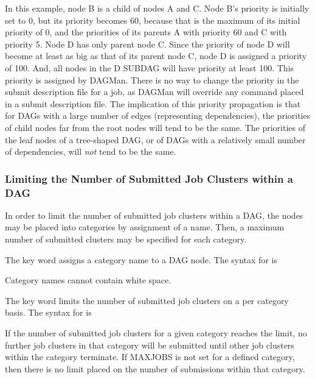 In this example, node B is a child of nodes A and C. 
Node B's priority is initially set to 0,
but its priority becomes 60,
because that is the maximum of its initial priority of 0,
and the priorities of its parents
A with priority 60 and C with priority 5.
Node D has only parent node C.
Since the priority of node D will become at least as big as that of 
its parent node C,
node D is assigned a priority of 100.
And, all nodes in the D SUBDAG will have priority at least 100.
This priority is assigned by DAGMan.
There is no way to change the priority in the submit description file for a job,
as DAGMan will override any  command placed
in a submit description file.
The implication of this priority propagation is
that for DAGs with a large number of edges (representing dependencies), 
the priorities of child nodes far from the root nodes 
will tend to be the same.
The priorities of the leaf nodes of a tree-shaped DAG,
or of DAGs with a relatively small number of dependencies,
will \emph{not} tend to be the same.

\subsubsection{\label{sec:DAG-node-category}Limiting the Number of Submitted Job Clusters within a DAG}


In order to limit the number of submitted job clusters within a DAG,
the nodes may be placed into categories by assignment of a name.
Then, a maximum number of submitted clusters may be specified
for each category.

The  key word assigns a category name to a DAG node.
The syntax for  is

  

Category names cannot contain white space.

The  key word limits the number of submitted job clusters
on a per category basis.
The syntax for  is

  

If the number of submitted job clusters for a given category reaches the limit,
no further job clusters in that category will be submitted until other
job clusters within the category terminate.
If MAXJOBS is not set for a defined category,
then there is no limit placed on the number of submissions
within that category.

